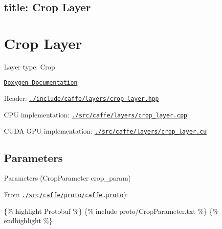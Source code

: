 

 \subsection*{title\+: Crop Layer }

\section*{Crop Layer}


\begin{DoxyItemize}
\item Layer type\+: {\ttfamily Crop}
\item \href{http://caffe.berkeleyvision.org/doxygen/classcaffe_1_1CropLayer.html}{\tt Doxygen Documentation}
\item Header\+: \href{https://github.com/BVLC/caffe/blob/master/include/caffe/layers/crop_layer.hpp}{\tt {\ttfamily ./include/caffe/layers/crop\+\_\+layer.hpp}}
\item C\+PU implementation\+: \href{https://github.com/BVLC/caffe/blob/master/src/caffe/layers/crop_layer.cpp}{\tt {\ttfamily ./src/caffe/layers/crop\+\_\+layer.cpp}}
\item C\+U\+DA G\+PU implementation\+: \href{https://github.com/BVLC/caffe/blob/master/src/caffe/layers/crop_layer.cu}{\tt {\ttfamily ./src/caffe/layers/crop\+\_\+layer.cu}}
\end{DoxyItemize}

\subsection*{Parameters}


\begin{DoxyItemize}
\item Parameters ({\ttfamily Crop\+Parameter crop\+\_\+param})
\item From \href{https://github.com/BVLC/caffe/blob/master/src/caffe/proto/caffe.proto}{\tt {\ttfamily ./src/caffe/proto/caffe.proto}})\+:
\end{DoxyItemize}

\{\% highlight Protobuf \%\} \{\% include proto/\+Crop\+Parameter.\+txt \%\} \{\% endhighlight \%\} 
